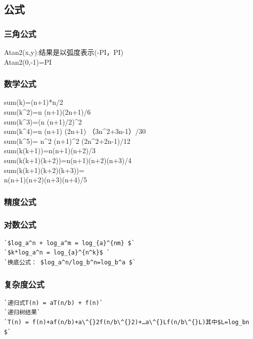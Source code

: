 \documentclass[a4paper]{article}
\begin{document}
\begin{CJK*}{UTF8}{gbsn}
\begin{multicols}{3}
\begin{flushleft}
\subsection{公式}

\subsubsection{三角公式}
Atan2(x,y):结果是以弧度表示(-PI，PI)\\
Atan2(0,-1)=PI\\

\subsubsection{数学公式}
sum(k)=(n+1)*n/2\\
sum(k\^{}2)=n (n+1)(2n+1)/6\\
sum(k\^{}3)=(n (n+1)/2)\^{}2\\
sum(k\^{}4)=n (n+1) (2n+1) （3n\^{}2+3n-1）/30\\
sum(k\^{}5)= n\^{}2 (n+1)\^{}2 (2n\^{}2+2n-1)/12\\
sum(k(k+1))=n(n+1)(n+2)/3\\
sum(k(k+1)(k+2))=n(n+1)(n+2)(n+3)/4\\
sum(k(k+1)(k+2)(k+3))=\\
n(n+1)(n+2)(n+3)(n+4)/5\\

\subsubsection{精度公式}


\subsubsection{对数公式}
\begin{lstlisting}
`$log_a^n + log_a^m = log_{a}^{nm} $`
`$k*log_a^n = log_{a}^{n^k}$ `
`换底公式： $log_a^n/log_b^n=log_b^a $`
\end{lstlisting}

\subsubsection{复杂度公式}
\begin{lstlisting}
`递归式T(n) = aT(n/b) + f(n)`
`递归树结果`
`T(n) = f(n)+af(n/b)+a\^{}2f(n/b\^{}2)+…a\^{}Lf(n/b\^{}L)其中$L=log_bn $`
\end{lstlisting}


\end{flushleft}
\end{multicols}
\end{CJK*}
\end{document}
